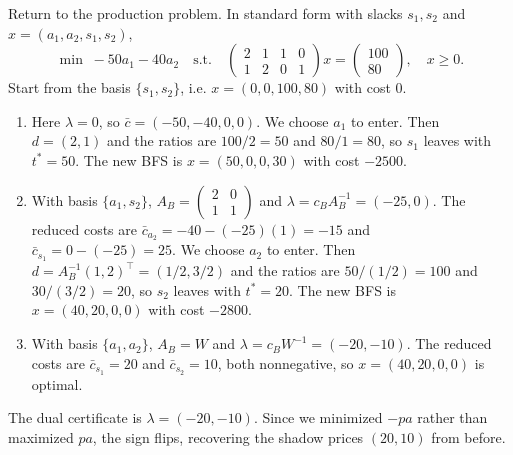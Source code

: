 	\begin{example}
	  \label{ex:simplex-on-the-furniture-problem}
		Return to the production problem. In standard form with slacks $s_1, s_2$ and $x = (a_1, a_2, s_1, s_2)$, 
		\begin{equation}
			\min\; -50a_1 - 40a_2 \quad \text{s.t.} \quad 
			\begin{pmatrix} 2 & 1 & 1 & 0 \\ 1 & 2 & 0 & 1 \end{pmatrix} x = \begin{pmatrix} 100 \\ 80 \end{pmatrix}, \quad x \geq 0.
		\end{equation}
		Start from the basis $\{s_1, s_2\}$, i.e. $x = (0, 0, 100, 80)$ with cost $0$. 
		\begin{enumerate}
			\item Here $\lambda = 0$, so $\bar c = (-50, -40, 0, 0)$. We choose $a_1$ to enter. Then $d = (2, 1)$ and the ratios are $100/2 = 50$ and $80/1 = 80$, so $s_1$ leaves with $t^\ast = 50$. The new BFS is $x = (50, 0, 0, 30)$ with cost $-2500$. 
			\item With basis $\{a_1, s_2\}$, $A_B = \begin{pmatrix} 2 & 0 \\ 1 & 1 \end{pmatrix}$ and $\lambda = c_B A_B^{-1} = (-25, 0)$. The reduced costs are $\bar c_{a_2} = -40 - (-25)(1) = -15$ and $\bar c_{s_1} = 0 - (-25) = 25$. We choose $a_2$ to enter. Then $d = A_B^{-1}(1, 2)^\top = (1/2, 3/2)$ and the ratios are $50 / (1/2) = 100$ and $30 / (3/2) = 20$, so $s_2$ leaves with $t^\ast = 20$. The new BFS is $x = (40, 20, 0, 0)$ with cost $-2800$. 
			\item With basis $\{a_1, a_2\}$, $A_B = W$ and $\lambda = c_B W^{-1} = (-20, -10)$. The reduced costs are $\bar c_{s_1} = 20$ and $\bar c_{s_2} = 10$, both nonnegative, so $x = (40, 20, 0, 0)$ is optimal. 
		\end{enumerate}
		The dual certificate is $\lambda = (-20, -10)$. Since we minimized $-pa$ rather than maximized $pa$, the sign flips, recovering the shadow prices $(20, 10)$ from before. 
	\end{example}

